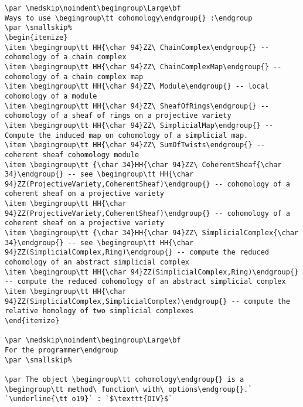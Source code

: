\documentclass[12pt,a4paper]{amsart}
\begin{document}
\begin{lstlisting}[language=Macaulay2output]
\par \medskip\noindent\begingroup\Large\bf
Ways to use \begingroup\tt cohomology\endgroup{} :\endgroup
\par \smallskip%
\begin{itemize}
\item \begingroup\tt HH{\char 94}ZZ\ ChainComplex\endgroup{} -- cohomology of a chain complex
\item \begingroup\tt HH{\char 94}ZZ\ ChainComplexMap\endgroup{} -- cohomology of a chain complex map
\item \begingroup\tt HH{\char 94}ZZ\ Module\endgroup{} -- local cohomology of a module
\item \begingroup\tt HH{\char 94}ZZ\ SheafOfRings\endgroup{} -- cohomology of a sheaf of rings on a projective variety
\item \begingroup\tt HH{\char 94}ZZ\ SimplicialMap\endgroup{} -- Compute the induced map on cohomology of a simplicial map.
\item \begingroup\tt HH{\char 94}ZZ\ SumOfTwists\endgroup{} -- coherent sheaf cohomology module
\item \begingroup\tt {\char 34}HH{\char 94}ZZ\ CoherentSheaf{\char 34}\endgroup{} -- see \begingroup\tt HH{\char 94}ZZ(ProjectiveVariety,CoherentSheaf)\endgroup{} -- cohomology of a coherent sheaf on a projective variety
\item \begingroup\tt HH{\char 94}ZZ(ProjectiveVariety,CoherentSheaf)\endgroup{} -- cohomology of a coherent sheaf on a projective variety
\item \begingroup\tt {\char 34}HH{\char 94}ZZ\ SimplicialComplex{\char 34}\endgroup{} -- see \begingroup\tt HH{\char 94}ZZ(SimplicialComplex,Ring)\endgroup{} -- compute the reduced cohomology of an abstract simplicial complex
\item \begingroup\tt HH{\char 94}ZZ(SimplicialComplex,Ring)\endgroup{} -- compute the reduced cohomology of an abstract simplicial complex
\item \begingroup\tt HH{\char 94}ZZ(SimplicialComplex,SimplicialComplex)\endgroup{} -- compute the relative homology of two simplicial complexes
\end{itemize}

\par \medskip\noindent\begingroup\Large\bf
For the programmer\endgroup
\par \smallskip%

\par The object \begingroup\tt cohomology\endgroup{} is a \begingroup\tt method\ function\ with\ options\endgroup{}.`
`\underline{\tt o19}` : `$\texttt{DIV}$`
\end{lstlisting}
\end{document}
